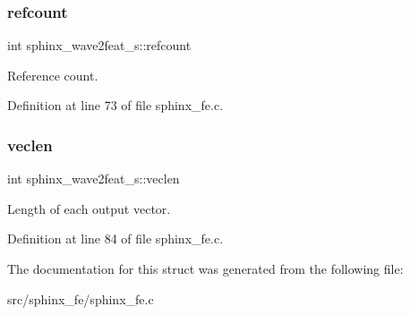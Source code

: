 \subsubsection{refcount}
{\footnotesize\ttfamily int sphinx\+\_\+wave2feat\+\_\+s\+::refcount}



Reference count. 



Definition at line 73 of file sphinx\+\_\+fe.\+c.

\mbox{\label{structsphinx__wave2feat__s_ad71e5fca7c13ae0258bcee81a6f1fa89}} 
\subsubsection{veclen}
{\footnotesize\ttfamily int sphinx\+\_\+wave2feat\+\_\+s\+::veclen}



Length of each output vector. 



Definition at line 84 of file sphinx\+\_\+fe.\+c.



The documentation for this struct was generated from the following file\+:\begin{DoxyCompactItemize}
\item 
src/sphinx\+\_\+fe/sphinx\+\_\+fe.\+c\end{DoxyCompactItemize}
